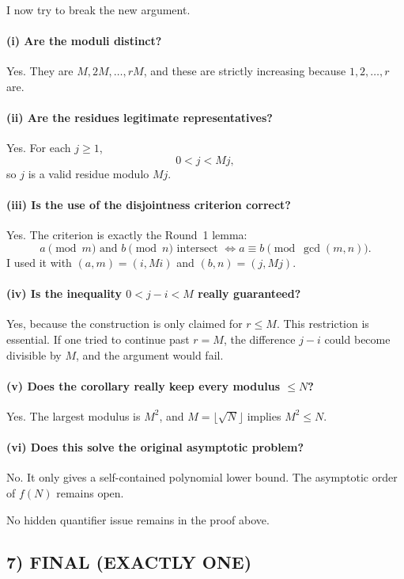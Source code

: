 I now try to break the new argument.

\paragraph{(i) Are the moduli distinct?}
Yes. They are $M,2M,\dots,rM$, and these are strictly increasing because $1,2,\dots,r$ are.

\paragraph{(ii) Are the residues legitimate representatives?}
Yes. For each $j\ge 1$,
\[
0<j<Mj,
\]
so $j$ is a valid residue modulo $Mj$.

\paragraph{(iii) Is the use of the disjointness criterion correct?}
Yes. The criterion is exactly the Round~1 lemma:
\[
a \pmod m \text{ and } b \pmod n \text{ intersect } \Longleftrightarrow a\equiv b \pmod{\gcd(m,n)}.
\]
I used it with $(a,m)=(i,Mi)$ and $(b,n)=(j,Mj)$.

\paragraph{(iv) Is the inequality $0<j-i<M$ really guaranteed?}
Yes, because the construction is only claimed for $r\le M$. This restriction is essential. If one tried to continue past $r=M$, the difference $j-i$ could become divisible by $M$, and the argument would fail.

\paragraph{(v) Does the corollary really keep every modulus $\le N$?}
Yes. The largest modulus is $M^2$, and $M=\lfloor \sqrt N\rfloor$ implies $M^2\le N$.

\paragraph{(vi) Does this solve the original asymptotic problem?}
No. It only gives a self-contained polynomial lower bound. The asymptotic order of $f(N)$ remains open.

No hidden quantifier issue remains in the proof above.

\subsection*{7) FINAL (EXACTLY ONE)}

